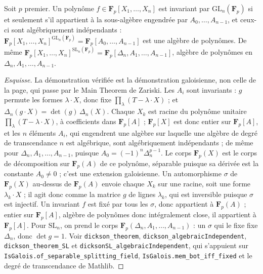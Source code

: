 \begin{encadre}
\begin{theoreme}
Soit $p$ premier. Un polynôme $f \in \mathbf F_p[X_1, \dots, X_n]$ est invariant par $\mathrm{GL}_n(\mathbf F_p)$ si et seulement s'il appartient à la sous-algèbre engendrée par $A_0, \dots, A_{n-1}$, et ceux-ci sont algébriquement indépendants : $\mathbf F_p[X_1, \dots, X_n]^{\mathrm{GL}_n(\mathbf F_p)} = \mathbf F_p[A_0, \dots, A_{n-1}]$ est une algèbre de polynômes. De même $\mathbf F_p[X_1, \dots, X_n]^{\mathrm{SL}_n(\mathbf F_p)} = \mathbf F_p[\Delta_n, A_1, \dots, A_{n-1}]$, algèbre de polynômes en $\Delta_n, A_1, \dots, A_{n-1}$.
\end{theoreme}
\end{encadre}

\begin{proof}[Esquisse]
La démonstration vérifiée est la démonstration galoisienne, non celle de la page, qui passe par le Main Theorem de Zariski. Les $A_i$ sont invariants : $g$ permute les formes $\lambda \cdot X$, donc fixe $\prod_\lambda (T - \lambda \cdot X)$ ; et $\Delta_n(g \cdot X) = \det(g)\,\Delta_n(X)$. Chaque $X_k$ est racine du polynôme unitaire $\prod_\lambda (T - \lambda \cdot X)$, à coefficients dans $\mathbf F_p[A]$ ; $\mathbf F_p[X]$ est donc entier sur $\mathbf F_p[A]$, et les $n$ éléments $A_i$, qui engendrent une algèbre sur laquelle une algèbre de degré de transcendance $n$ est algébrique, sont algébriquement indépendants ; de même pour $\Delta_n, A_1, \dots, A_{n-1}$, puisque $A_0 = (-1)^n \Delta_n^{p-1}$. Le corps $\mathbf F_p(X)$ est le corps de décomposition sur $\mathbf F_p(A)$ de ce polynôme, séparable puisque sa dérivée est la constante $A_0 \neq 0$ ; c'est une extension galoisienne. Un automorphisme $\sigma$ de $\mathbf F_p(X)$ au-dessus de $\mathbf F_p(A)$ envoie chaque $X_k$ sur une racine, soit une forme $\lambda_k \cdot X$ ; il agit donc comme la matrice $g$ de lignes $\lambda_k$, qui est inversible puisque $\sigma$ est injectif. Un invariant $f$ est fixé par tous les $\sigma$, donc appartient à $\mathbf F_p(A)$ ; entier sur $\mathbf F_p[A]$, algèbre de polynômes donc intégralement close, il appartient à $\mathbf F_p[A]$. Pour $\mathrm{SL}_n$, on prend le corps $\mathbf F_p(\Delta_n, A_1, \dots, A_{n-1})$ : un $\sigma$ qui le fixe fixe $\Delta_n$, donc $\det g = 1$. Voir \texttt{dickson\_theorem}, \texttt{dickson\_algebraicIndependent}, \texttt{dickson\_theorem\_SL} et \texttt{dicksonSL\_algebraicIndependent}, qui s'appuient sur \texttt{IsGalois.\allowbreak{}of\_separable\_splitting\_field}, \texttt{IsGalois.\allowbreak{}mem\_bot\_iff\_fixed} et le degré de transcendance de Mathlib.
\end{proof}


